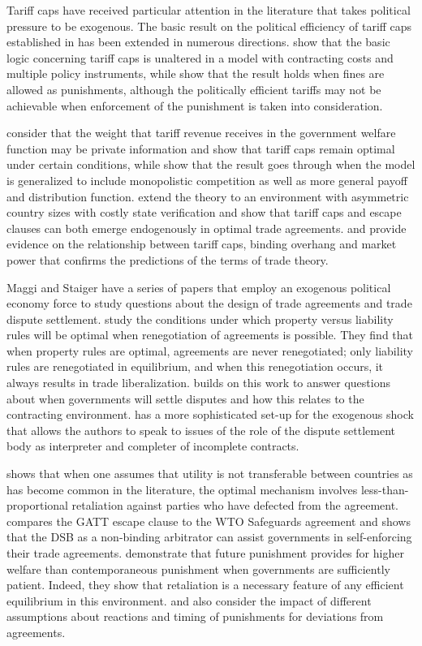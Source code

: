 Tariff caps have received particular attention in the literature that takes political pressure to be exogenous. The basic result on the political efficiency of tariff caps established in \Textcite{bs2005} has been extended in numerous directions. \Textcite{hms} show that the basic logic concerning tariff caps is unaltered in a model with contracting costs and multiple policy instruments, while \Textcite{ls} show that the result holds when fines are allowed as punishments, although the politically efficient tariffs may not be achievable when enforcement of the punishment is taken into consideration. 

\Textcite{ab2012} consider that the weight that tariff revenue receives in the government welfare function may be private information and show that tariff caps remain optimal under certain conditions, while \Textcite{ab2013} show that the result goes through when the \Textcite{bs2005} model is generalized to include monopolistic competition as well as more general payoff and distribution function. \Textcite{bb} extend the theory to an environment with asymmetric country sizes with costly state verification and show that tariff caps and escape clauses can both emerge endogenously in optimal trade agreements. \Textcite{bbr} and \Textcite{nos} provide evidence on the relationship between tariff caps, binding overhang and market power that confirms the predictions of the terms of trade theory.

Maggi and Staiger have a series of papers that employ an exogenous political economy force to study questions about the design of trade agreements and trade dispute settlement. \Textcite{ms2012a} study the conditions under which property versus liability rules will be optimal when renegotiation of agreements is possible. They find that when property rules are optimal, agreements are never renegotiated; only liability rules are renegotiated in equilibrium, and when this renegotiation occurs, it always results in trade liberalization. \Textcite{ms2013} builds on this work to answer questions about when governments will settle disputes and how this relates to the contracting environment. \Textcite{ms2011} has a more sophisticated set-up for the exogenous shock that allows the authors to speak to issues of the role of the dispute settlement body as interpreter and completer of incomplete contracts.
		
\Textcite{beshkar2010a} shows that when one assumes that utility is not transferable between countries as has become common in the literature, the optimal mechanism involves less-than-proportional retaliation against parties who have defected from the agreement. \Textcite{beshkar2010b} compares the GATT escape clause to the WTO Safeguards agreement and shows that the DSB as a non-binding arbitrator can assist governments in self-enforcing their trade agreements. \Textcite{martinvergote} demonstrate that future punishment provides for higher welfare than contemporaneous punishment when governments are sufficiently patient. Indeed, they show that retaliation is a necessary feature of any efficient equilibrium in this environment. \Textcite{hungerford} and \Textcite{riezman1991} also consider the impact of different assumptions about reactions and timing of punishments for deviations from agreements.

